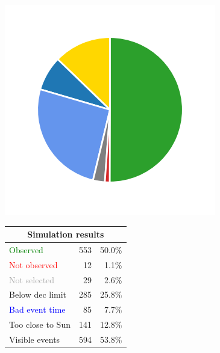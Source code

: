 \begin{colsection}
\begin{colsection}
\begin{figure}[p]
\begin{center}
    \begin{minipage}[t]{0.2\textwidth}\vspace{10pt}
    \includegraphics[width=\linewidth]{images/gw_sims/1n8_pie.png}
    \end{minipage}
    \begin{minipage}[t]{0.37\textwidth}\vspace{0pt}
    \begin{tabular}{lrr}
    \multicolumn{3}{c}{\textbf{Simulation results}} \\
    \midrule
    \textcolor{Green}{Observed} & 553 & 50.0\% \\
    \textcolor{Red}{Not observed} & 12 & 1.1\% \\
    \textcolor{darkgray}{Not selected} & 29 & 2.6\% \\
    \textcolor{NavyBlue}{Below dec limit} & 285 & 25.8\% \\
    \textcolor{Blue}{Bad event time} & 85 & 7.7\% \\
    \textcolor{BurntOrange}{Too close to Sun} & 141 & 12.8\% \\
    \midrule
    Visible events & 594 &  53.8\% \\
    \end{tabular}
    \end{minipage}

\end{center}
\end{figure}
\end{colsection}
\end{colsection}
